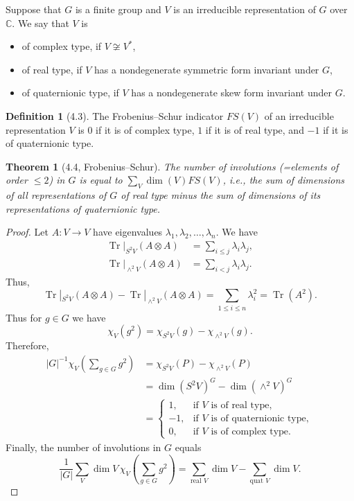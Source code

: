 \documentclass[UTF8,11pt]{ctexart}
\newtheorem*{theorem}{Theorem}
\theoremstyle{definition}
\newtheorem*{definition}{Definition}
\DeclareMathOperator{\Tr}{Tr}
\newcommand{\C}{\mathbb C}
\begin{document}
Suppose that $G$ is a finite group and $V$ is an irreducible representation of $G$ over $\C$. We say that $V$ is
\begin{itemize}
\item of complex type, if $V\not\cong V^*$,
\item of real type, if $V$ has a nondegenerate symmetric form invariant under $G$,
\item of quaternionic type, if $V$ has a nondegenerate skew form invariant under $G$.
\end{itemize}
\begin{definition}[4.3]
The Frobenius--Schur indicator $FS(V)$ of an irreducible representation $V$ is $0$ if it is of complex type, $1$ if it is of real type, and $-1$ if it is of quaternionic type.
\end{definition}
\begin{theorem}[4.4, Frobenius--Schur]
The number of involutions (=elements of order $\leq2$) in $G$ is equal to $\sum_V\dim(V)FS(V)$, i.e., the sum of dimensions of all representations of $G$ of real type minus the sum of dimensions of its representations of quaternionic type.
\end{theorem}
\begin{proof}
Let $A:V\to V$ have eigenvalues $\lambda_1,\lambda_2,\ldots,\lambda_n$. We have
\begin{align*}
\Tr|_{S^2V}(A\otimes A)&=\sum_{i\leq j}\lambda_i\lambda_j,\\
\Tr|_{\wedge^2V}(A\otimes A)&=\sum_{i<j}\lambda_i\lambda_j.
\end{align*}
Thus,
\[
\Tr|_{S^2V}(A\otimes A)-\Tr|_{\wedge^2V}(A\otimes A)
=\sum_{1\leq i\leq n}\lambda_i^2=\Tr(A^2).
\]
Thus for $g\in G$ we have
\[\chi_V(g^2)=\chi_{S^2V}(g)-\chi_{\wedge^2V}(g).\]
Therefore,
\begin{align*}
|G|^{-1}\chi_V\left(\sum_{g\in G}g^2\right)
&=\chi_{S^2V}(P)-\chi_{\wedge^2V}(P)\\
&=\dim(S^2V)^G-\dim(\wedge^2V)^G\\
&=\begin{cases}
1,&\text{if $V$ is of real type},\\
-1,&\text{if $V$ is of quaternionic type},\\
0,&\text{if $V$ is of complex type}.
\end{cases}
\end{align*}
Finally, the number of involutions in $G$ equals
\[
\frac1{|G|}\sum_V\dim V\,\chi_V\left(\sum_{g\in G}g^2\right)
=\sum_{\text{real }V}\dim V-\sum_{\text{quat }V}\dim V.
\]
\end{proof}
\end{document}
